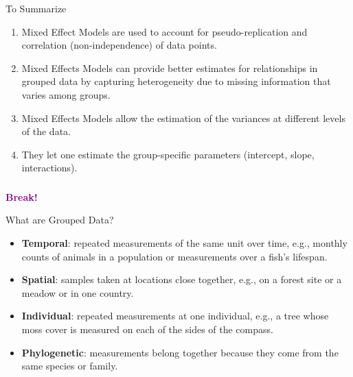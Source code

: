 \documentclass{beamer}
\begin{document}
\begin{frame}{To Summarize}

  \begin{enumerate}
      \item Mixed Effect Models are used to account for pseudo-replication and correlation (non-independence) of data points.
      \item Mixed Effects Models can provide better estimates for relationships in grouped data by capturing heterogeneity due to missing information that varies among groups.
      \item Mixed Effects Models allow the estimation of the variances at different levels of the data.
          \item They let one estimate the group-specific parameters (intercept, slope, interactions).
    \end{enumerate}
    
 \end{frame}


\begin{frame}
  \frametitle{}
  \begin{center}
    \huge\textbf{\textcolor{purple}{Break!}}
  \end{center}
\end{frame}

\begin{frame}{What are Grouped Data?}
  \begin{itemize}
    \item \textbf{Temporal}: repeated measurements of the same unit over time, e.g., monthly counts of animals in a population or measurements over a fish's lifespan.
    \item \textbf{Spatial}: samples taken at locations close together, e.g., on a forest site or a meadow or in one country.
    \item \textbf{Individual}: repeated measurements at one individual, e.g., a tree whose moss cover is measured on each of the sides of the compass.
    \item \textbf{Phylogenetic}: measurements belong together because they come from the same species or family.
  \end{itemize}
\end{frame}
\end{document}
